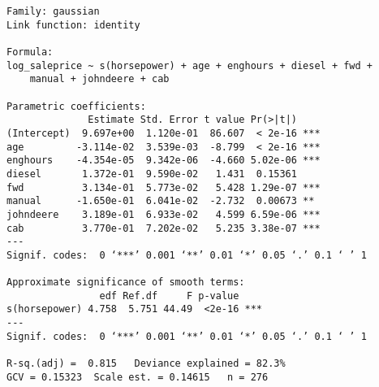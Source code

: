 \begin{verbatim}
Family: gaussian 
Link function: identity 

Formula:
log_saleprice ~ s(horsepower) + age + enghours + diesel + fwd + 
    manual + johndeere + cab

Parametric coefficients:
              Estimate Std. Error t value Pr(>|t|)    
(Intercept)  9.697e+00  1.120e-01  86.607  < 2e-16 ***
age         -3.114e-02  3.539e-03  -8.799  < 2e-16 ***
enghours    -4.354e-05  9.342e-06  -4.660 5.02e-06 ***
diesel       1.372e-01  9.590e-02   1.431  0.15361    
fwd          3.134e-01  5.773e-02   5.428 1.29e-07 ***
manual      -1.650e-01  6.041e-02  -2.732  0.00673 ** 
johndeere    3.189e-01  6.933e-02   4.599 6.59e-06 ***
cab          3.770e-01  7.202e-02   5.235 3.38e-07 ***
---
Signif. codes:  0 ‘***’ 0.001 ‘**’ 0.01 ‘*’ 0.05 ‘.’ 0.1 ‘ ’ 1

Approximate significance of smooth terms:
                edf Ref.df     F p-value    
s(horsepower) 4.758  5.751 44.49  <2e-16 ***
---
Signif. codes:  0 ‘***’ 0.001 ‘**’ 0.01 ‘*’ 0.05 ‘.’ 0.1 ‘ ’ 1

R-sq.(adj) =  0.815   Deviance explained = 82.3%
GCV = 0.15323  Scale est. = 0.14615   n = 276
\end{verbatim}